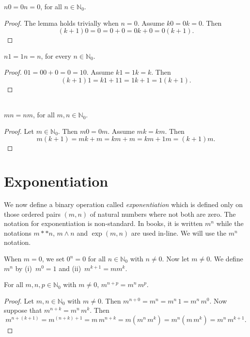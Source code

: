 \begin{lemma}
$n0= 0n=0$, for all $n\in \mathbb{N}_0$.
\end{lemma}

\begin{proof}
The lemma holds trivially when $n=0$.  Assume $k0=
0k=0$.  Then
\[
(k+1)0 =0 = 0+0= 0k+0=0(k+1).
\]
\end{proof}

\begin{lemma}
$n1 =1n=n$, for every $n\in \mathbb{N}_0$.
\end{lemma}
\begin{proof}
$01=00+0=0 =10$.  Assume
$k1=1k=k$.  Then
\[
(k+1)1=k1+11=1k+1=1(k+1).
\]
\end{proof}

\begin{theorem}{}\\
$mn=nm$, for all $m,n\in \mathbb{N}_0$.
\end{theorem}

\begin{proof} Let $m\in \mathbb{N}_0$.
Then $m0=0m$.
Assume $mk=km$. Then
\[
m (k+1) = mk +m = km+m= km +1m=(k+1)m.
\]
\end{proof}

\section{Exponentiation}

We now define a binary operation called \textit{exponentiation}
which is defined only on those ordered pairs $(m,n)$ of natural
numbers where not both are zero.  The notation for exponentiation
is non-standard.  In books, it is written $m^n$ while the notations
$m**n$, $m\wedge n$ and $\exp(m,n)$ are used in-line.  We will use
the $m^n$ notation.

When $m=0$, we set $0^n=0$ for all $n\in\mathbb{N}_0$
with $n\neq0$.  Now let $m\neq0$.  We define $m^n$ by
(i)~$m^0=1$ and (ii)~$m^{k+1}=mm^k$.

\begin{theorem}
For all $m,n,p\in\mathbb{N}_0$ with $m\neq0$,
$m^{n+p}=m^n\,m^p$.
\end{theorem}

\begin{proof}
Let $m,n\in\mathbb{N}_0$ with $m\neq0$.  Then
$m^{n+0}=m^n=m^n\,1=m^n\,m^0$.
Now suppose that $m^{n+k}=m^n\,m^k$.
Then
\[
m^{n+(k+1)}=m^{(n+k)+1}=m\,m^{n+k}
 = m(m^n\,m^k)=m^n(m\,m^k)=m^n\,m^{k+1}.
\]
\end{proof}

